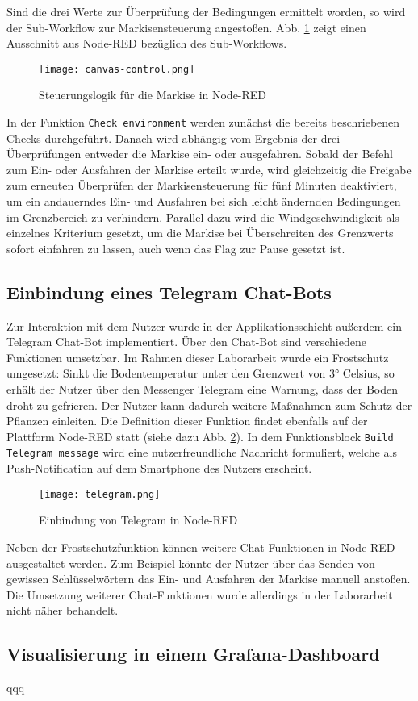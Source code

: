 Sind die drei Werte zur Überprüfung der Bedingungen ermittelt worden, so wird der Sub-Workflow zur Markisensteuerung angestoßen. Abb. \ref{fig:canvas-control} zeigt einen Ausschnitt aus Node-RED bezüglich des Sub-Workflows.

\begin{figure}[h]
  \centering
  \texttt{[image: canvas-control.png]}
  \caption{Steuerungslogik für die Markise in Node-RED}\label{fig:canvas-control}
\end{figure}

In der Funktion \texttt{Check environment} werden zunächst die bereits beschriebenen Checks durchgeführt. Danach wird abhängig vom Ergebnis der drei Überprüfungen entweder die Markise ein- oder ausgefahren.
Sobald der Befehl zum Ein- oder Ausfahren der Markise erteilt wurde, wird gleichzeitig die Freigabe zum erneuten Überprüfen der Markisensteuerung für fünf Minuten deaktiviert, um ein andauerndes Ein- und Ausfahren bei sich leicht ändernden Bedingungen im Grenzbereich zu verhindern. Parallel dazu wird die Windgeschwindigkeit als einzelnes Kriterium gesetzt, um die Markise bei Überschreiten des Grenzwerts sofort einfahren zu lassen, auch wenn das Flag zur Pause gesetzt ist.

\subsection{Einbindung eines Telegram Chat-Bots}

Zur Interaktion mit dem Nutzer wurde in der Applikationsschicht außerdem ein Telegram Chat-Bot implementiert. Über den Chat-Bot sind verschiedene Funktionen umsetzbar. Im Rahmen dieser Laborarbeit wurde ein Frostschutz umgesetzt: Sinkt die Bodentemperatur unter den Grenzwert von 3° Celsius, so erhält der Nutzer über den Messenger Telegram eine Warnung, dass der Boden droht zu gefrieren. Der Nutzer kann dadurch weitere Maßnahmen zum Schutz der Pflanzen einleiten. Die Definition dieser Funktion findet ebenfalls auf der Plattform Node-RED statt (siehe dazu Abb. \ref{fig:telegram}). In dem Funktionsblock \texttt{Build Telegram message} wird eine nutzerfreundliche Nachricht formuliert, welche als Push-Notification auf dem Smartphone des Nutzers erscheint.

\begin{figure}[h]
  \centering
  \texttt{[image: telegram.png]}
  \caption{Einbindung von Telegram in Node-RED}\label{fig:telegram}
\end{figure}

Neben der Frostschutzfunktion können weitere Chat-Funktionen in Node-RED ausgestaltet werden. Zum Beispiel könnte der Nutzer über das Senden von gewissen Schlüsselwörtern das Ein- und Ausfahren der Markise manuell anstoßen. Die Umsetzung weiterer Chat-Funktionen wurde allerdings in der Laborarbeit nicht näher behandelt.

\subsection{Visualisierung in einem Grafana-Dashboard}

qqq